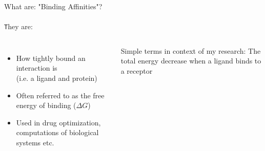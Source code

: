 \documentclass[aspectratio=169]{beamer}
\begin{document}
\begin{frame}{What are: "Binding Affinities"?}
  \framesubtitle{}

\begin{flushleft}
 \texttt They are:
\end{flushleft}

  \begin{columns}
      \begin{itemize}
        \item How tightly bound an interaction is \\(i.e. a ligand and protein) 
        \item Often referred to as the free energy of binding ($\Delta G$)
        \item Used in drug optimization, computations of biological systems etc.
      \end{itemize}

      \begin{block}{Simple terms in context of my research:}
         The total energy decrease when a ligand binds to a receptor
      \end{block}
  \end{columns}
  
\end{frame}
\end{document}
